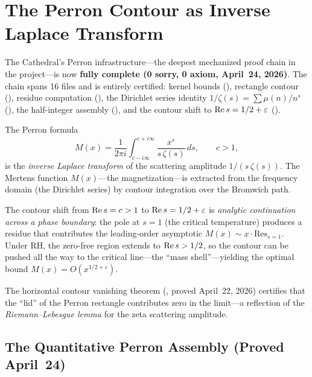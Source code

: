 \documentclass[11pt,a4paper]{article}
\begin{document}
\section{The Perron Contour as Inverse Laplace Transform}
\label{sec:perron}

The Cathedral's Perron infrastructure---the deepest mechanized proof chain
in the project---is now \textbf{fully complete (0 sorry, 0 axiom, April~24, 2026)}.
The chain spans 16 files and is entirely certified:
kernel bounds (), rectangle contour
(), residue computation
(), the Dirichlet series identity
$1/\zeta(s) = \sum \mu(n)/n^s$ (),
the half-integer assembly (), and the
contour shift to $\operatorname{Re} s = 1/2 + \varepsilon$ ().

\begin{principle}
The Perron formula
\[
  M(x) = \frac{1}{2\pi i}
  \int_{c - i\infty}^{c + i\infty}
  \frac{x^s}{s\,\zeta(s)}\,ds,
  \qquad c > 1,
\]
is the \emph{inverse Laplace transform} of the scattering amplitude
$1/(s\,\zeta(s))$. The Mertens function $M(x)$---the magnetization---is
extracted from the frequency domain (the Dirichlet series) by contour
integration over the Bromwich path.

The contour shift from $\operatorname{Re} s = c > 1$ to $\operatorname{Re} s = 1/2 + \varepsilon$
is \emph{analytic continuation across a phase boundary}: the pole at $s = 1$
(the critical temperature) produces a residue that contributes the
leading-order asymptotic $M(x) \sim x \cdot \mathrm{Res}_{s=1}$. Under RH,
the zero-free region extends to $\operatorname{Re} s > 1/2$, so the contour can be
pushed all the way to the critical line---the ``mass shell''---yielding
the optimal bound $M(x) = O(x^{1/2+\varepsilon})$.

The horizontal contour vanishing theorem (,
proved April~22, 2026) certifies that the ``lid'' of the Perron rectangle
contributes zero in the limit---a reflection of the \emph{Riemann--Lebesgue
lemma} for the zeta scattering amplitude.
\end{principle}

\subsection{The Quantitative Perron Assembly (Proved April~24)}
\end{document}
